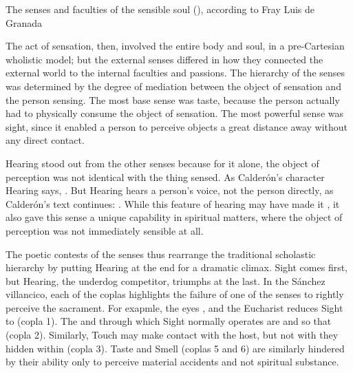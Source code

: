 \begin{table}
    \caption{The senses and faculties of the sensible soul (), according to Fray Luis de Granada}
    \label{table:senses-fray-luis}
\end{table}

The act of sensation, then, involved the entire body and soul, in a pre-Cartesian wholistic model; but the external senses differed in how they connected the external world to the internal faculties and passions.
The hierarchy of the senses was determined by the degree of mediation between the object of sensation and the person sensing.
The most base sense was taste, because the person actually had to physically consume the object of sensation.
The most powerful sense was sight, since it enabled a person to perceive objects a great distance away without any direct contact.

Hearing stood out from the other senses because for it alone, the object of perception was not identical with the thing sensed.
As Calderón's character Hearing says, .%
\autocite[]{Calderon:Retiro}
But Hearing hears a person's voice, not the person directly, as Calderón's text continues: .%
\autocite[]{Calderon:Retiro}
While this feature of hearing may have made it , it also gave this sense a unique capability in spiritual matters, where the object of perception was not immediately sensible at all.

The poetic contests of the senses thus rearrange the traditional scholastic hierarchy by putting Hearing at the end for a dramatic climax.
Sight comes first, but Hearing, the underdog competitor, triumphs at the last.
In the Sánchez villancico, each of the coplas highlights the failure of one of the senses to rightly perceive the sacrament.
For exapmle, the eyes , and the Eucharist reduces Sight to  (copla 1).
The  and  through which Sight normally operates are   and  so that  (copla 2).
Similarly, Touch may make contact with the host, but not with they  hidden within (copla 3).
Taste and Smell (coplas 5 and 6) are similarly hindered by their ability only to perceive material accidents and not spiritual substance.

